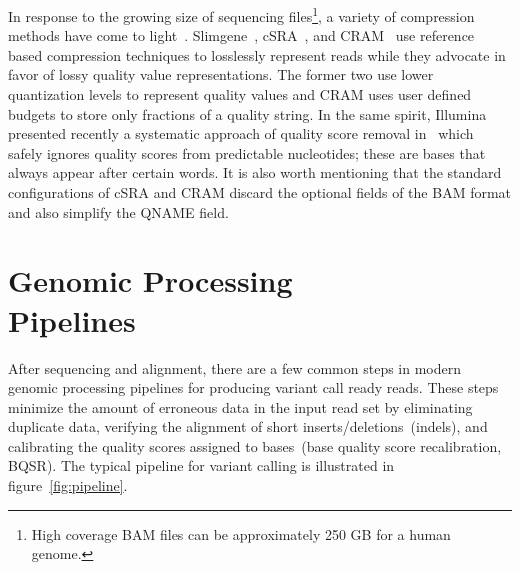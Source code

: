 \documentclass[10pt,twocolumn]{article}
\begin{document}
In response to the growing size of sequencing files\footnote{High coverage BAM files can be approximately 250 GB for a human genome.},
a variety of compression methods have come to light~\cite{kozanitis2011, fritz11, WanBioinformatics, Popitsch2012, Asnani2012, CoxBW, 
recoil, Jones2012, Janin2013}. Slimgene~\cite{kozanitis2011}, cSRA~\cite{SRA}, and CRAM~\cite{fritz11} use reference based compression
techniques to losslessly represent reads while they advocate in favor of lossy quality value representations. The former two use lower
quantization levels to represent quality values and CRAM uses user defined budgets to store only fractions of a quality string. 
In the same spirit, Illumina presented recently a systematic approach of quality score removal in~\cite{Janin2013} which safely ignores
quality scores from predictable nucleotides; these are bases that always appear after certain words. It is also worth mentioning that the
standard configurations of cSRA and CRAM discard the optional fields of the BAM format and also simplify the QNAME field. 

\section{Genomic Processing\\Pipelines}
\label{sec:genomic-processing-pipelines}

After sequencing and alignment, there are a few common steps in modern genomic processing pipelines for producing
variant call ready reads. These steps minimize the amount of erroneous data in the input read set by eliminating duplicate data,
verifying the alignment of short inserts/deletions~(indels), and calibrating the quality scores assigned to bases~(base quality score
recalibration, BQSR). The typical pipeline for variant calling is illustrated in figure~\ref{fig:pipeline}.
\end{document}
